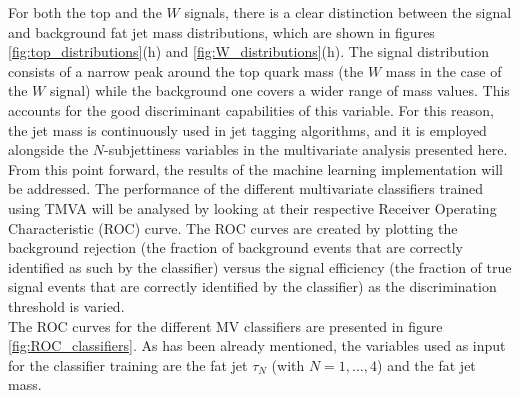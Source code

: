 \documentclass[main]{subfiles} %
\begin{document}
For both the top and the $W$ signals, there is a clear distinction between the signal and background fat jet mass distributions, which are shown in figures \ref{fig:top_distributions}(h) and \ref{fig:W_distributions}(h). The signal distribution consists of a narrow peak around the top quark mass (the $W$ mass in the case of the $W$ signal) while the background one covers a wider range of mass values. This accounts for the good discriminant capabilities of this variable. For this reason, the jet mass is continuously used in jet tagging algorithms, and it is employed alongside the $N$-subjettiness variables in the multivariate analysis presented here. \\

From this point forward, the results of the machine learning implementation will be addressed. The performance of the different multivariate classifiers trained using \textsc{TMVA} will be analysed by looking at their respective Receiver Operating Characteristic (ROC) curve. The ROC curves are created by plotting the background rejection (the fraction of background events that are correctly identified as such by the classifier) versus the signal efficiency (the fraction of true signal events that are correctly identified by the classifier) as the discrimination threshold is varied. \\

The ROC curves for the different MV classifiers are presented in figure \ref{fig:ROC_classifiers}. As has been already mentioned, the variables used as input for the classifier training are the fat jet $\tau_N$ (with $N = 1,\dots,4$) and the fat jet mass. \\
\end{document}
